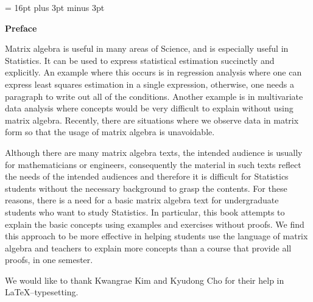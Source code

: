 \baselineskip = 16pt plus 3pt minus 3pt
\begin{center}
{\Large \bf Preface}
\end{center}

\noindent Matrix algebra is useful in many areas of Science, and is especially
useful in Statistics.
It can be used to express statistical estimation succinctly and explicitly.
An example where this occurs is in
regression analysis where one can express least squares estimation
in a single expression, otherwise, one needs a paragraph to write out
all of the conditions.  Another example is in
multivariate data analysis where concepts would be very difficult
to explain without using matrix algebra.
Recently, there are situations where we observe data
in matrix form so that the usage of matrix algebra is unavoidable.

Although there are many matrix algebra texts, the intended audience is usually
for mathematicians or engineers, consequently the material in such texts reflect
the needs of the intended audiences and
therefore
it is difficult for Statistics students without the necessary background
to grasp the contents.
For these reasons, there is a need for a basic matrix algebra text
for undergraduate students who want to study Statistics.
In particular, this book attempts to explain the basic concepts using examples and exercises without proofs.
We find this approach to be more effective in helping students use the language of matrix algebra
and teachers to explain more concepts than a course that provide all proofs,
in one semester.

We would like to thank Kwangrae Kim and Kyudong Cho for their help in \LaTeX --typesetting. 